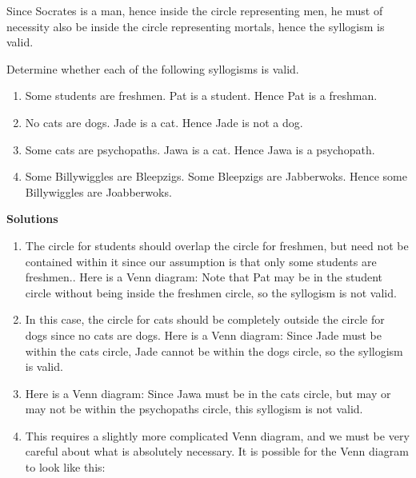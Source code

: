 
Since Socrates is a man, hence inside the circle representing men, he must of necessity also be inside the circle representing mortals, hence the syllogism is valid. 

\begin{example}
Determine whether each of the following syllogisms is valid.
\begin{enumerate}\itemsep0pt
\item Some students are freshmen. Pat is a student. Hence Pat is a freshman.
\item No cats are dogs. Jade is a cat. Hence Jade is not a dog.
\item Some cats are psychopaths. Jawa is a cat. Hence Jawa is a psychopath.
\item Some Billywiggles are Bleepzigs. Some Bleepzigs are Jabberwoks. Hence some Billywiggles are Joabberwoks.
\end{enumerate}
{\upshape\bfseries Solutions}
\begin{enumerate}\itemsep0pt
\item The circle for students should overlap the circle for freshmen, but need not be contained within it since our assumption is that only some students are freshmen.. Here is a  Venn diagram:
Note that Pat may be in the student circle without being inside the freshmen circle, so the syllogism is not valid. 
\item In this case, the circle for cats should be completely outside the circle for dogs since no cats are dogs. Here is a Venn diagram:
Since Jade must be within the cats circle, Jade cannot be within the dogs circle, so the syllogism is valid.
\item Here is a Venn diagram:
Since Jawa must be in the cats circle, but may or may not be within the psychopaths circle, this syllogism is not valid.
\item This requires a slightly more complicated Venn diagram, and we must be very careful about what is absolutely necessary. It is possible for the Venn diagram to look like this:
\begin{center}
\end{center}
\end{enumerate}
\end{example}
